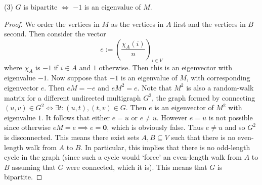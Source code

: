 (3) $G$ is bipartite $\iff$ $-1$ is an eigenvalue of $M$.

\begin{proof}
	We order the vertices in $M$ as the vertices in $A$ first and the vertices in $B$ second. Then consider the vector 
	$$e := \left(\frac{{\chi_A(i)}}{n}\right)_{i\in V}$$
	where $\chi_A$ is $-1$ if $i\in A$ and $1$ otherwise. Then this is an eigenvector with eigenvalue $-1$. Now suppose that $-1$ is an eigenvalue of $M$, with corresponding eigenvector $e$. Then $eM=-e$ and $eM^2 = e$. Note that $M^2$ is also a random-walk matrix for a different undirected multigraph $G^2$, the graph formed by connecting $(u,v)\in G^2\iff \exists t:(u,t),(t,v)\in G$. Then $e$ is an eigenvector of $M^2$ with eigenvalue $1$. It follows that either $e=u$ or $e\neq u$. However $e=u$ is not possible since otherwise $eM=e\implies e=\mathbf{0}$, which is obviously false. Thus $e\neq u$ and so $G^2$ is disconnected. This means there exist sets $A, B\subseteq V$ such that there is no even-length walk from $A$ to $B$. In particular, this implies that there is no odd-length cycle in the graph (since such a cycle would `force' an even-length walk from $A$ to $B$ assuming that $G$ were connected, which it is). This means that $G$ is bipartite.
\end{proof}